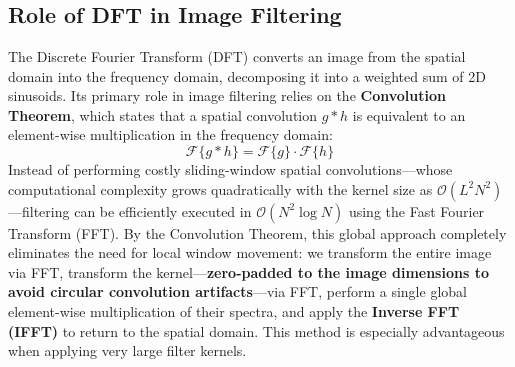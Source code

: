 
\section[Question -- {\it DFT in image filtering}]{}

\subsection{Role of DFT in Image Filtering}
The Discrete Fourier Transform (DFT) converts an image from the spatial domain into the frequency domain, decomposing it into a weighted sum of 2D sinusoids. Its primary role in image filtering relies on the \textbf{Convolution Theorem}, which states that a spatial convolution $g * h$ is equivalent to an element-wise multiplication in the frequency domain:
\[
  \mathcal{F}\{g * h\} = \mathcal{F}\{g\} \cdot \mathcal{F}\{h\}
\]
Instead of performing costly sliding-window spatial convolutions—whose computational complexity grows quadratically with the kernel size as $\mathcal{O}(L^2 N^2)$—filtering can be efficiently executed in $\mathcal{O}(N^2 \log N)$ using the Fast Fourier Transform (FFT). 
By the Convolution Theorem, this global approach completely eliminates the need for local window movement: we transform the entire image via FFT, transform the kernel—\textbf{zero-padded to the image dimensions to avoid circular convolution artifacts}—via FFT, perform a single global element-wise multiplication of their spectra, and apply the \textbf{Inverse FFT (IFFT)} to return to the spatial domain. This method is especially advantageous when applying very large filter kernels.

